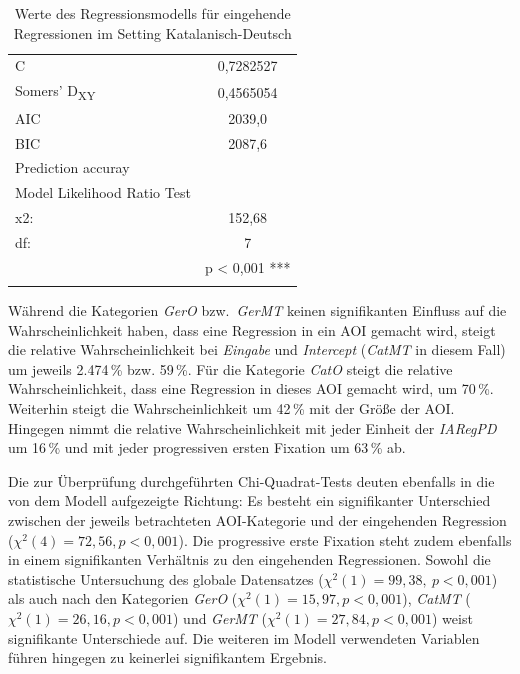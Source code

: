 \begin{table}
\begin{tabular}{lS[table-format=4.7]}
    {C} 	&	0,7282527 \\
    {Somers' D\textsubscript{XY}} 	&		0,4565054 \\
    {AIC} 		&	2039,0 \\
    {BIC} 		&	2087,6 \\\midrule
    Prediction accuray & \\
    Model Likelihood Ratio Test\\
    x2: &  152,68\\
    df: & 7 \\
        & {p < 0,001} *** \\
        \lspbottomrule
    \end{tabular}
    \caption[Werte des Regressionsmodells für eingehende Regressionen]
            {Werte des Regressionsmodells für eingehende Regressionen im 
             Setting Katalanisch-Deutsch\label{K6:tab:CatDe:RegIn-Modell-Stats}}
\end{table}


Während die Kategorien \emph{GerO} bzw.\ \emph{GerMT} keinen signifikanten Einfluss auf die Wahrscheinlichkeit haben, dass eine Regression in ein AOI gemacht wird, steigt die relative Wahrscheinlichkeit bei \emph{Eingabe} und \emph{Intercept} (\emph{CatMT} in diesem Fall) um jeweils 2.474\,\% bzw. 59\,\%. Für die Kategorie \emph{CatO} steigt die relative Wahrscheinlichkeit, dass eine Regression in dieses AOI gemacht wird, um 70\,\%. Weiterhin steigt die Wahrscheinlichkeit um 42\,\% mit der Größe der AOI. Hingegen nimmt die relative Wahrscheinlichkeit mit jeder Einheit der \emph{IARegPD} um 16\,\% und mit jeder progressiven ersten Fixation um 63\,\% ab.\largerpage[-1]

Die zur Überprüfung durchgeführten Chi-Quadrat-Tests deuten ebenfalls in die von dem Modell aufgezeigte Richtung: Es besteht ein signifikanter Unterschied zwischen der jeweils betrachteten AOI-Kategorie und der eingehenden Regression ($\chi^2(4) = 72,56, p < 0,001$). Die progressive erste Fixation steht zudem ebenfalls in einem signifikanten Verhältnis zu den eingehenden Regressionen. Sowohl die statistische Untersuchung des globale Datensatzes ($\chi^2(1) = 99,38,\allowbreak\ p < 0,001$) als auch nach den Kategorien \emph{GerO} ($\chi^2(1) = 15,97, p < 0,001$), \emph{CatMT} ($\chi^2(1) = 26,16, p < 0,001$) und \emph{GerMT} ($\chi^2(1) = 27,84, p < 0,001$) weist signifikante Unterschiede auf. Die weiteren im Modell verwendeten Variablen führen hingegen zu keinerlei signifikantem Ergebnis.


